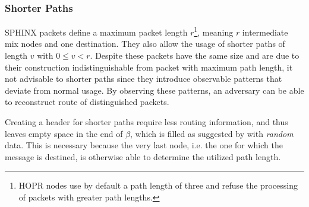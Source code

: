 \subsubsection{Shorter Paths}
\label{sec:sphinx:shorterpaths}

SPHINX packets define a maximum packet length $r$\footnote{HOPR nodes use by default a path length of three and refuse the processing of packets with greater path lengths.}, meaning $r$ intermediate mix nodes and one destination. They also allow the usage of shorter paths of length $v$ with $0 \le v < r$. Despite these packets have the same size and are due to their construction indistinguishable from packet with maximum path length, it not advisable to shorter paths since they introduce observable patterns that deviate from normal usage. By observing these patterns, an adversary can be able to reconstruct route of distinguished packets.

Creating a header for shorter paths require less routing information, and thus leaves empty space in the end of $\beta$, which is filled as suggested by \cite{sphinxpaperfix} with \textit{random} data. This is necessary because the very last node, i.e. the one for which the message is destined, is otherwise able to determine the utilized path length.

